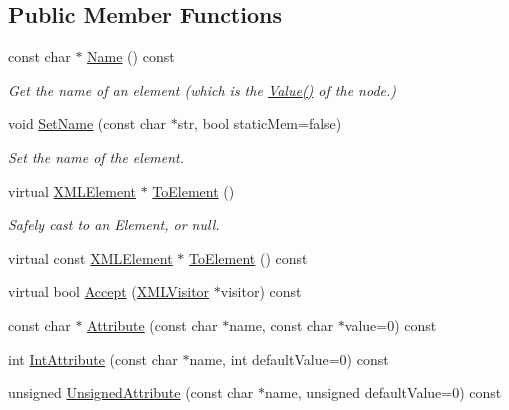 \subsection*{Public Member Functions}
\begin{DoxyCompactItemize}
\item 
const char $\ast$ \hyperlink{classtinyxml2_1_1_x_m_l_element_a63e057fb5baee1dd29f323cb85907b35}{Name} () const
\begin{DoxyCompactList}\small\item\em Get the name of an element (which is the \hyperlink{classtinyxml2_1_1_x_m_l_node_a0485e51c670e741884cfd8362274d680}{Value()} of the node.) \end{DoxyCompactList}\item 
void \hyperlink{classtinyxml2_1_1_x_m_l_element_a97712009a530d8cb8a63bf705f02b4f1}{Set\+Name} (const char $\ast$str, bool static\+Mem=false)
\begin{DoxyCompactList}\small\item\em Set the name of the element. \end{DoxyCompactList}\item 
virtual \hyperlink{classtinyxml2_1_1_x_m_l_element}{X\+M\+L\+Element} $\ast$ \hyperlink{classtinyxml2_1_1_x_m_l_element_ad9ff5c2dbc15df36cf664ce1b0ea0a5d}{To\+Element} ()
\begin{DoxyCompactList}\small\item\em Safely cast to an Element, or null. \end{DoxyCompactList}\item 
virtual const \hyperlink{classtinyxml2_1_1_x_m_l_element}{X\+M\+L\+Element} $\ast$ \hyperlink{classtinyxml2_1_1_x_m_l_element_afeb353047ab8532191709dcaef07337e}{To\+Element} () const
\item 
virtual bool \hyperlink{classtinyxml2_1_1_x_m_l_element_a9b2119831e8b85827d5d3e5076788e4a}{Accept} (\hyperlink{classtinyxml2_1_1_x_m_l_visitor}{X\+M\+L\+Visitor} $\ast$visitor) const
\item 
const char $\ast$ \hyperlink{classtinyxml2_1_1_x_m_l_element_a48cf4a315cfbac7d74cd0d5ff2c5df51}{Attribute} (const char $\ast$name, const char $\ast$value=0) const
\item 
int \hyperlink{classtinyxml2_1_1_x_m_l_element_a95a89b13bb14a2d4655e2b5b406c00d4}{Int\+Attribute} (const char $\ast$name, int default\+Value=0) const
\item 
unsigned \hyperlink{classtinyxml2_1_1_x_m_l_element_afea43a1d4aa33e3703ddee5fc9adc26c}{Unsigned\+Attribute} (const char $\ast$name, unsigned default\+Value=0) const

\end{DoxyCompactItemize}
